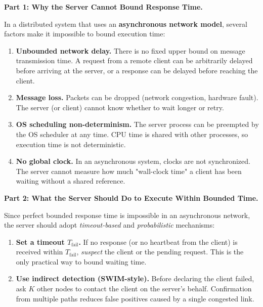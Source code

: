 \documentclass[12pt,a4paper]{article}
\begin{document}
\begin{solbox}
\textbf{Part 1: Why the Server Cannot Bound Response Time.}

In a distributed system that uses an \textbf{asynchronous network model}, several
factors make it impossible to bound execution time:

\begin{enumerate}
  \item \textbf{Unbounded network delay.}
        There is no fixed upper bound on message transmission time.
        A request from a remote client can be arbitrarily delayed before arriving
        at the server, or a response can be delayed before reaching the client.

  \item \textbf{Message loss.}
        Packets can be dropped (network congestion, hardware fault).
        The server (or client) cannot know whether to wait longer or retry.

  \item \textbf{OS scheduling non-determinism.}
        The server process can be preempted by the OS scheduler at any time.
        CPU time is shared with other processes, so execution time is not deterministic.

  \item \textbf{No global clock.}
        In an asynchronous system, clocks are not synchronized.
        The server cannot measure how much "wall-clock time" a client has been waiting
        without a shared reference.
\end{enumerate}

\medskip
\textbf{Part 2: What the Server Should Do to Execute Within Bounded Time.}

Since perfect bounded response time is impossible in an asynchronous network,
the server should adopt \emph{timeout-based} and \emph{probabilistic} mechanisms:

\begin{enumerate}
  \item \textbf{Set a timeout $T_{\text{fail}}$.}
        If no response (or no heartbeat from the client) is received within
        $T_{\text{fail}}$, \emph{suspect} the client or the pending request.
        This is the only practical way to bound waiting time.

  \item \textbf{Use indirect detection (SWIM-style).}
        Before declaring the client failed, ask $K$ other nodes to contact the client
        on the server's behalf. Confirmation from multiple paths reduces false positives
        caused by a single congested link.


\end{enumerate}
\end{solbox}
\end{document}
